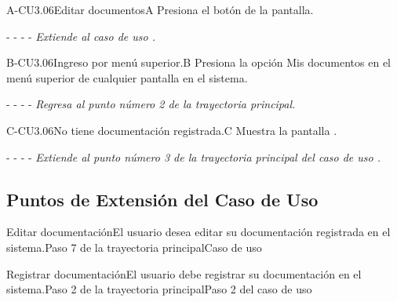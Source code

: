 
	
	\begin{UCtrayectoriaA}{A-CU3.06}{Editar documentos}{A}
	    \UCpaso[\UCactor]Presiona el botón  de la pantalla.
	    \item[- -] - - {\em Extiende al caso de uso .} 
	\end{UCtrayectoriaA}
	\begin{UCtrayectoriaA}{B-CU3.06}{Ingreso por menú superior.}{B}
	    \UCpaso[\UCactor]Presiona la opción Mis documentos en el menú superior de cualquier pantalla en el sistema. %
	    \item[- -] - - {\em Regresa al punto número 2 de la trayectoria principal.}
	\end{UCtrayectoriaA}
	
	\begin{UCtrayectoriaA}{C-CU3.06}{No tiene documentación registrada.}{C}
	    \UCpaso[\UCsist] Muestra la pantalla . %
	    \item[- -] - - {\em Extiende al punto número 3 de la trayectoria principal del caso de uso .}
	\end{UCtrayectoriaA}
	
	
	\subsection{Puntos de Extensión del Caso de Uso}

	\begin{UCExtenssionPoint}{Editar documentación}{El usuario desea editar su documentación registrada en el sistema.}{Paso 7 de la trayectoria principal}{Caso de uso  } 
	\end{UCExtenssionPoint}
	
	\begin{UCExtenssionPoint}{Registrar documentación}{El usuario debe registrar su documentación en el sistema.}{Paso 2 de la trayectoria principal}{Paso 2 del caso de uso } 
	\end{UCExtenssionPoint}